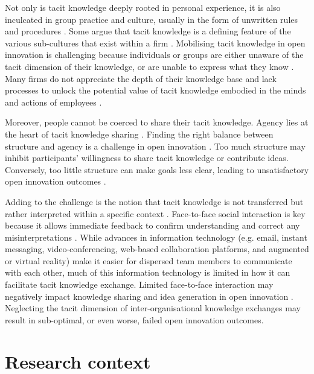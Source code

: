 Not only is tacit knowledge deeply rooted in personal experience, it is also inculcated in group practice and culture, usually in the form of unwritten rules and procedures \citep{nonaka1995knowledge,howells1996tacit}. Some argue that tacit knowledge is a defining feature of the various sub-cultures that exist within a firm \citep[e.g.][]{smith2001role,munoz2015tacit}. Mobilising tacit knowledge in open innovation is challenging because individuals or groups are either unaware of the tacit dimension of their knowledge, or are unable to express what they know \citep{polanyi1966tacit}. Many firms do not appreciate the depth of their knowledge base and lack processes to unlock the potential value of tacit knowledge embodied in the minds and actions of employees \citep{nonaka1994dynamic,howells1996tacit,horvath2000working}. \medskip

Moreover, people cannot be coerced to share their tacit knowledge. Agency lies at the heart of tacit knowledge sharing \citep{polanyi1966tacit, emirbayer1994network}. Finding the right balance between structure and agency is a challenge in open innovation \citep{longo2017struggling}. Too much structure may inhibit participants' willingness to share tacit knowledge or contribute ideas. Conversely, too little structure can make goals less clear, leading to unsatisfactory open innovation outcomes \citep{davis2010agency,lam2014tacit}. \medskip

Adding to the challenge is the notion that tacit knowledge is not transferred but rather interpreted within a specific context \citep{nonaka1995knowledge,duguid2005art,marabelli2014knowing,zhang2020extended}. Face-to-face social interaction is key because it allows immediate feedback to confirm understanding and correct any misinterpretations \citep{haldin2000difficulties,gertler2003tacit,koskinen2003tacit}. While advances in information technology (e.g. email, instant messaging, video-conferencing, web-based collaboration platforms, and augmented or virtual reality) make it easier for dispersed team members to communicate with each other, much of this information technology is limited in how it can facilitate tacit knowledge exchange. Limited face-to-face interaction may negatively impact knowledge sharing and idea generation in open innovation \citep{johannessen2001mismanagement}. Neglecting the tacit dimension of inter-organisational knowledge exchanges may result in sub-optimal, or even worse, failed open innovation outcomes. 

\section{Research context}


